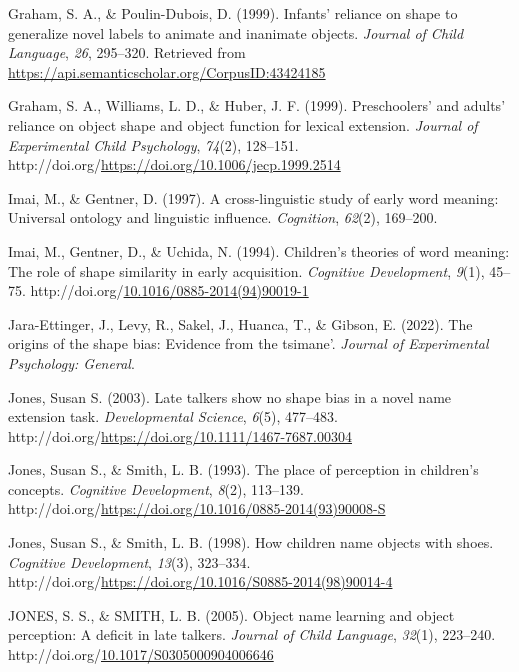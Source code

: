 \documentclass[10pt, letterpaper]{article}
\newenvironment{CSLReferences}%
  {}%
  {\par}
\begin{document}
\begin{CSLReferences}{1}{0}
\leavevmode{}%
Graham, S. A., \& Poulin-Dubois, D. (1999). Infants' reliance on shape
to generalize novel labels to animate and inanimate objects.
\emph{Journal of Child Language}, \emph{26}, 295--320. Retrieved from
\url{https://api.semanticscholar.org/CorpusID:43424185}

\leavevmode{}%
Graham, S. A., Williams, L. D., \& Huber, J. F. (1999). Preschoolers'
and adults' reliance on object shape and object function for lexical
extension. \emph{Journal of Experimental Child Psychology},
\emph{74}(2), 128--151.
http://doi.org/\url{https://doi.org/10.1006/jecp.1999.2514}

\leavevmode{}%
Imai, M., \& Gentner, D. (1997). A cross-linguistic study of early word
meaning: Universal ontology and linguistic influence. \emph{Cognition},
\emph{62}(2), 169--200.

\leavevmode{}%
Imai, M., Gentner, D., \& Uchida, N. (1994). Children's theories of word
meaning: {The} role of shape similarity in early acquisition.
\emph{Cognitive Development}, \emph{9}(1), 45--75.
http://doi.org/\href{https://doi.org/10.1016/0885-2014(94)90019-1}{10.1016/0885-2014(94)90019-1}

\leavevmode{}%
Jara-Ettinger, J., Levy, R., Sakel, J., Huanca, T., \& Gibson, E.
(2022). The origins of the shape bias: Evidence from the tsimane'.
\emph{Journal of Experimental Psychology: General}.

\leavevmode{}%
Jones, Susan S. (2003). Late talkers show no shape bias in a novel name
extension task. \emph{Developmental Science}, \emph{6}(5), 477--483.
http://doi.org/\url{https://doi.org/10.1111/1467-7687.00304}

\leavevmode{}%
Jones, Susan S., \& Smith, L. B. (1993). The place of perception in
children's concepts. \emph{Cognitive Development}, \emph{8}(2),
113--139.
http://doi.org/\url{https://doi.org/10.1016/0885-2014(93)90008-S}

\leavevmode{}%
Jones, Susan S., \& Smith, L. B. (1998). How children name objects with
shoes. \emph{Cognitive Development}, \emph{13}(3), 323--334.
http://doi.org/\url{https://doi.org/10.1016/S0885-2014(98)90014-4}

\leavevmode{}%
JONES, S. S., \& SMITH, L. B. (2005). Object name learning and object
perception: A deficit in late talkers. \emph{Journal of Child Language},
\emph{32}(1), 223--240.
http://doi.org/\href{https://doi.org/10.1017/S0305000904006646}{10.1017/S0305000904006646}


\end{CSLReferences}
\end{document}
